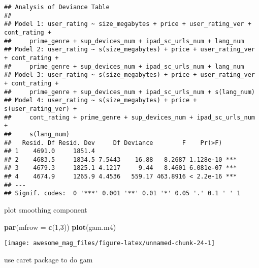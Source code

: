 \documentclass[]{article}
\newenvironment{Shaded}{\begin{snugshade}}{\end{snugshade}}
\newcommand{\KeywordTok}[1]{\textcolor[rgb]{0.13,0.29,0.53}{\textbf{#1}}}
\newcommand{\DataTypeTok}[1]{\textcolor[rgb]{0.13,0.29,0.53}{#1}}
\newcommand{\DecValTok}[1]{\textcolor[rgb]{0.00,0.00,0.81}{#1}}
\newcommand{\StringTok}[1]{\textcolor[rgb]{0.31,0.60,0.02}{#1}}
\newcommand{\CommentTok}[1]{\textcolor[rgb]{0.56,0.35,0.01}{\textit{#1}}}
\newcommand{\OtherTok}[1]{\textcolor[rgb]{0.56,0.35,0.01}{#1}}
\newcommand{\OperatorTok}[1]{\textcolor[rgb]{0.81,0.36,0.00}{\textbf{#1}}}
\newcommand{\NormalTok}[1]{#1}
\begin{document}
\begin{verbatim}
## Analysis of Deviance Table
## 
## Model 1: user_rating ~ size_megabytes + price + user_rating_ver + cont_rating + 
##     prime_genre + sup_devices_num + ipad_sc_urls_num + lang_num
## Model 2: user_rating ~ s(size_megabytes) + price + user_rating_ver + cont_rating + 
##     prime_genre + sup_devices_num + ipad_sc_urls_num + lang_num
## Model 3: user_rating ~ s(size_megabytes) + price + user_rating_ver + cont_rating + 
##     prime_genre + sup_devices_num + ipad_sc_urls_num + s(lang_num)
## Model 4: user_rating ~ s(size_megabytes) + price + s(user_rating_ver) + 
##     cont_rating + prime_genre + sup_devices_num + ipad_sc_urls_num + 
##     s(lang_num)
##   Resid. Df Resid. Dev     Df Deviance        F    Pr(>F)    
## 1    4691.0     1851.4                                       
## 2    4683.5     1834.5 7.5443    16.88   8.2687 1.128e-10 ***
## 3    4679.3     1825.1 4.1217     9.44   8.4601 6.081e-07 ***
## 4    4674.9     1265.9 4.4536   559.17 463.8916 < 2.2e-16 ***
## ---
## Signif. codes:  0 '***' 0.001 '**' 0.01 '*' 0.05 '.' 0.1 ' ' 1
\end{verbatim}

plot smoothing component

\begin{Shaded}
\begin{Highlighting}[]
\KeywordTok{par}\NormalTok{(}\DataTypeTok{mfrow =} \KeywordTok{c}\NormalTok{(}\DecValTok{1}\NormalTok{,}\DecValTok{3}\NormalTok{))}
\KeywordTok{plot}\NormalTok{(gam.m4)}
\end{Highlighting}
\end{Shaded}

\texttt{[image: awesome\_mag\_files/figure-latex/unnamed-chunk-24-1]}

use caret package to do gam

\begin{Shaded}
\end{Shaded}
\end{document}
